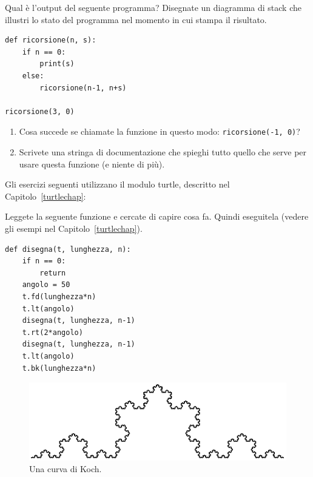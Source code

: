 \documentclass[10pt]{book}
\begin{document}
\vspace{0.2in}
\begin{exercise}

Qual è l'output del seguente programma?
Disegnate un diagramma di stack che illustri lo stato del programma nel momento in cui stampa il risultato.

\begin{verbatim}
def ricorsione(n, s):
    if n == 0:
        print(s)
    else:
        ricorsione(n-1, n+s)

ricorsione(3, 0)
\end{verbatim}

\begin{enumerate}

\item Cosa succede se chiamate la funzione in questo modo: {\tt ricorsione(-1, 0)}?

\item Scrivete una stringa di documentazione che spieghi tutto quello che serve per usare questa funzione (e niente di più).

\end{enumerate}

\end{exercise}

Gli esercizi seguenti utilizzano il modulo turtle, descritto nel Capitolo~\ref{turtlechap}:

\vspace{0.2in}
\begin{exercise}

Leggete la seguente funzione e cercate di capire cosa fa. Quindi eseguitela (vedere gli esempi nel Capitolo~\ref{turtlechap}).

\begin{verbatim}
def disegna(t, lunghezza, n):
    if n == 0:
        return
    angolo = 50
    t.fd(lunghezza*n)
    t.lt(angolo)
    disegna(t, lunghezza, n-1)
    t.rt(2*angolo)
    disegna(t, lunghezza, n-1)
    t.lt(angolo)
    t.bk(lunghezza*n)
\end{verbatim}

\end{exercise}
\begin{figure}
\centerline
{\includegraphics[scale=0.8]{figs/koch.pdf}}
\caption{Una curva di Koch.}
\label{fig.koch}
\end{figure}
\end{document}

